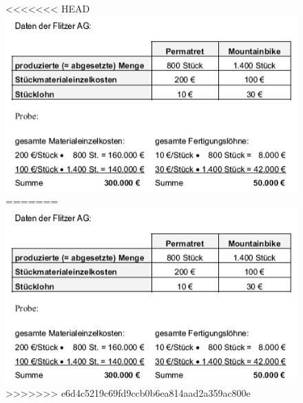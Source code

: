 \documentclass[a4paper,11pt, twoside]{article}
\begin{document}
\begin{figure}[h]
 \begin{center}
<<<<<<< HEAD
   \includegraphics[scale=0.6]{bilder/beispiel_zuschlagskalkulation.png}
=======
   \includegraphics[scale=0.5]{bilder/beispiel_zuschlagskalkulation.png}
>>>>>>> e6d4c5219c69fd9ccb0b6ea814aad2a359ac800e
 \end{center}
\end{figure}
\end{document}
